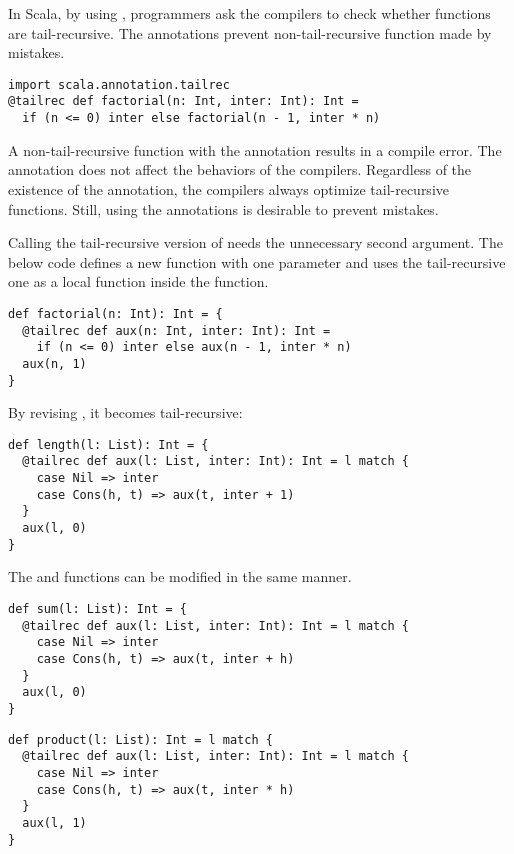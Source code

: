 In Scala, by using , programmers ask the compilers to check
whether functions are tail-recursive. The annotations prevent non-tail-recursive
function made by mistakes.

\begin{verbatim}
import scala.annotation.tailrec
@tailrec def factorial(n: Int, inter: Int): Int =
  if (n <= 0) inter else factorial(n - 1, inter * n)
\end{verbatim}

A non-tail-recursive function with the  annotation results in a
compile error. The annotation does not affect the behaviors of the compilers.
Regardless of the existence of the annotation, the compilers always optimize
tail-recursive functions. Still, using the annotations is desirable to prevent
mistakes.

Calling the tail-recursive version of  needs the unnecessary
second argument. The below code defines a new  function with one
parameter and uses the tail-recursive one as a local function inside the
function.

\begin{verbatim}
def factorial(n: Int): Int = {
  @tailrec def aux(n: Int, inter: Int): Int =
    if (n <= 0) inter else aux(n - 1, inter * n)
  aux(n, 1)
}
\end{verbatim}

By revising , it becomes tail-recursive:

\begin{verbatim}
def length(l: List): Int = {
  @tailrec def aux(l: List, inter: Int): Int = l match {
    case Nil => inter
    case Cons(h, t) => aux(t, inter + 1)
  }
  aux(l, 0)
}
\end{verbatim}

The  and  functions can be modified in the same manner.

\begin{verbatim}
def sum(l: List): Int = {
  @tailrec def aux(l: List, inter: Int): Int = l match {
    case Nil => inter
    case Cons(h, t) => aux(t, inter + h)
  }
  aux(l, 0)
}
\end{verbatim}

\begin{verbatim}
def product(l: List): Int = l match {
  @tailrec def aux(l: List, inter: Int): Int = l match {
    case Nil => inter
    case Cons(h, t) => aux(t, inter * h)
  }
  aux(l, 1)
}
\end{verbatim}

